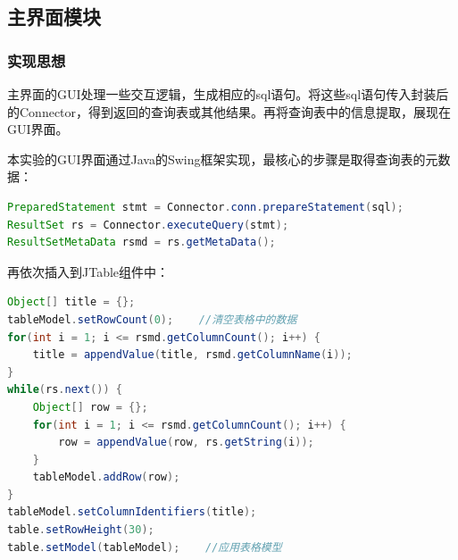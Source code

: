 \documentclass[withoutpreface,bwprint]{cumcmthesis} %
\begin{document}
\subsection{主界面模块}
\subsubsection{实现思想}
主界面的GUI处理一些交互逻辑，生成相应的sql语句。将这些sql语句传入封装后的Connector，得到返回的查询表或其他结果。再将查询表中的信息提取，展现在GUI界面。\par 
本实验的GUI界面通过Java的Swing框架实现，最核心的步骤是取得查询表的元数据：
\begin{lstlisting}[language=java]
PreparedStatement stmt = Connector.conn.prepareStatement(sql);
ResultSet rs = Connector.executeQuery(stmt);
ResultSetMetaData rsmd = rs.getMetaData();
\end{lstlisting}
再依次插入到JTable组件中：
\begin{lstlisting}[language=java]
Object[] title = {};
tableModel.setRowCount(0);    //清空表格中的数据
for(int i = 1; i <= rsmd.getColumnCount(); i++) {
    title = appendValue(title, rsmd.getColumnName(i));
}
while(rs.next()) {
    Object[] row = {};
    for(int i = 1; i <= rsmd.getColumnCount(); i++) {
        row = appendValue(row, rs.getString(i));
    }
    tableModel.addRow(row);
}
tableModel.setColumnIdentifiers(title);
table.setRowHeight(30);
table.setModel(tableModel);    //应用表格模型
\end{lstlisting}
\end{document}
